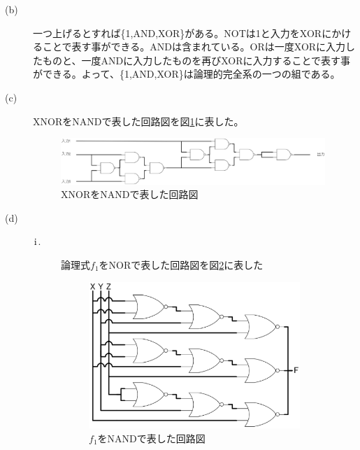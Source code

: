 \documentclass{jsarticle}
\begin{document}
\begin{description}
\begin{description}
          \item [(b)]
          一つ上げるとすれば\{1,AND,XOR\}がある。NOTは1と入力をXORにかけることで表す事ができる。ANDは含まれている。ORは一度XORに入力したものと、一度ANDに入力したものを再びXORに入力することで表す事ができる。よって、\{1,AND,XOR\}は論理的完全系の一つの組である。

          \item [(c)]
          XNORをNANDで表した回路図を図\ref{fig:3c}に表した。
          \begin{figure}[H]
              \centering
              \includegraphics[width=10cm]{logic_3c.eps}
              \caption{XNORをNANDで表した回路図}
              \label{fig:3c}
          \end{figure}

          \item [(d)]
          \begin{description}
              \item [$\rm \hspace{.08em}i\hspace{.08em}$.]
              論理式$f_1$をNORで表した回路図を図\ref{fig:3d_1}に表した
              \begin{figure}[H]
                  \centering
                  \includegraphics[width=8cm]{logic_3d_1.eps}
                  \caption{$f_1$をNANDで表した回路図}
                  \label{fig:3d_1}
              \end{figure}


\end{description}
\end{description}
\end{description}
\end{document}
